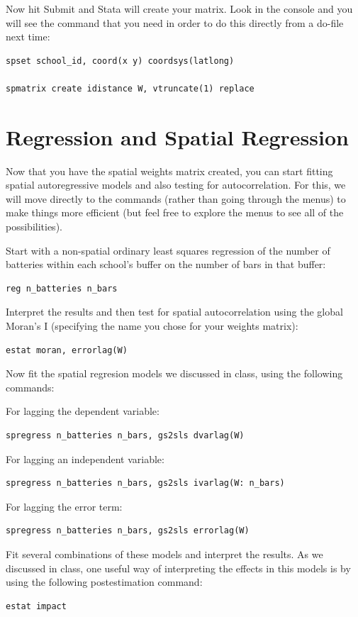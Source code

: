 \documentclass[]{book}
\begin{document}
Now hit Submit and Stata will create your matrix. Look in the console and you will see the command that you need in order to do this directly from a do-file next time:

\begin{verbatim}
spset school_id, coord(x y) coordsys(latlong)
 
spmatrix create idistance W, vtruncate(1) replace
\end{verbatim}

\hypertarget{regression-and-spatial-regression}{%
\section{Regression and Spatial Regression}\label{regression-and-spatial-regression}}

Now that you have the spatial weights matrix created, you can start fitting spatial autoregressive models and also testing for autocorrelation. For this, we will move directly to the commands (rather than going through the menus) to make things more efficient (but feel free to explore the menus to see all of the possibilities).

Start with a non-spatial ordinary least squares regression of the number of batteries within each school's buffer on the number of bars in that buffer:

\begin{verbatim}
reg n_batteries n_bars
\end{verbatim}

Interpret the results and then test for spatial autocorrelation using the global Moran's I (specifying the name you chose for your weights matrix):

\begin{verbatim}
estat moran, errorlag(W)
\end{verbatim}

Now fit the spatial regresion models we discussed in class, using the following commands:

For lagging the dependent variable:

\begin{verbatim}
spregress n_batteries n_bars, gs2sls dvarlag(W)
\end{verbatim}

For lagging an independent variable:

\begin{verbatim}
spregress n_batteries n_bars, gs2sls ivarlag(W: n_bars)
\end{verbatim}

For lagging the error term:

\begin{verbatim}
spregress n_batteries n_bars, gs2sls errorlag(W)
\end{verbatim}

Fit several combinations of these models and interpret the results. As we discussed in class, one useful way of interpreting the effects in this models is by using the following postestimation command:

\begin{verbatim}
estat impact
\end{verbatim}


\end{document}
